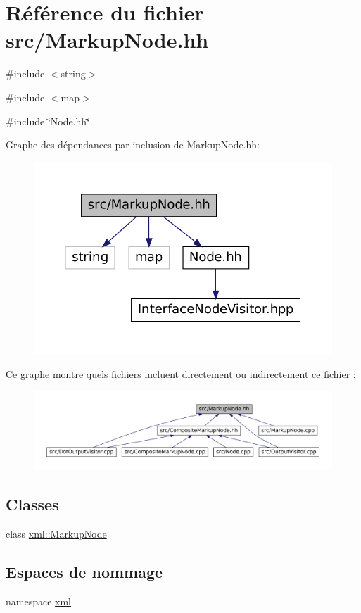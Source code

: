 \hypertarget{_markup_node_8hh}{
\section{Référence du fichier src/MarkupNode.hh}
\label{_markup_node_8hh}
}
{\ttfamily \#include $<$string$>$}\par
{\ttfamily \#include $<$map$>$}\par
{\ttfamily \#include \char`\"{}Node.hh\char`\"{}}\par
Graphe des dépendances par inclusion de MarkupNode.hh:\nopagebreak
\begin{figure}[H]
\begin{center}
\leavevmode
\includegraphics[width=375pt]{_markup_node_8hh__incl}
\end{center}
\end{figure}
Ce graphe montre quels fichiers incluent directement ou indirectement ce fichier :\nopagebreak
\begin{figure}[H]
\begin{center}
\leavevmode
\includegraphics[width=400pt]{_markup_node_8hh__dep__incl}
\end{center}
\end{figure}
\subsection*{Classes}
\begin{DoxyCompactItemize}
\item 
class \hyperlink{classxml_1_1_markup_node}{xml::MarkupNode}
\end{DoxyCompactItemize}
\subsection*{Espaces de nommage}
\begin{DoxyCompactItemize}
\item 
namespace \hyperlink{namespacexml}{xml}
\end{DoxyCompactItemize}
